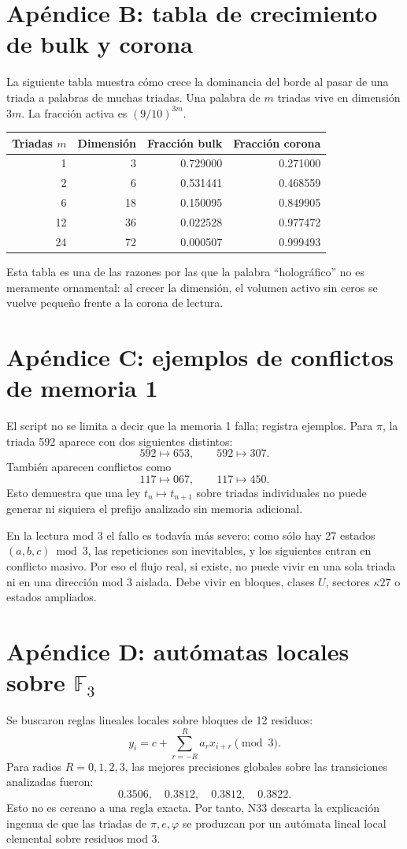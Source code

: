 \documentclass[11pt,a4paper]{article}
\begin{document}
\section{Apéndice B: tabla de crecimiento de bulk y corona}
La siguiente tabla muestra cómo crece la dominancia del borde al pasar de una triada a palabras de muchas triadas. Una palabra de \(m\) triadas vive en dimensión \(3m\). La fracción activa es \((9/10)^{3m}\).

\begin{center}
\begin{tabular}{rrrr}
\toprule
Triadas \(m\) & Dimensión & Fracción bulk & Fracción corona\\
\midrule
1 & 3 & 0.729000 & 0.271000\\
2 & 6 & 0.531441 & 0.468559\\
6 & 18 & 0.150095 & 0.849905\\
12 & 36 & 0.022528 & 0.977472\\
24 & 72 & 0.000507 & 0.999493\\
\bottomrule
\end{tabular}
\end{center}

Esta tabla es una de las razones por las que la palabra ``holográfico'' no es meramente ornamental: al crecer la dimensión, el volumen activo sin ceros se vuelve pequeño frente a la corona de lectura.

\section{Apéndice C: ejemplos de conflictos de memoria 1}
El script no se limita a decir que la memoria 1 falla; registra ejemplos. Para \(\pi\), la triada 592 aparece con dos siguientes distintos:
\[
592\mapsto653,
\qquad
592\mapsto307.
\]
También aparecen conflictos como
\[
117\mapsto067,
\qquad
117\mapsto450.
\]
Esto demuestra que una ley \(t_n\mapsto t_{n+1}\) sobre triadas individuales no puede generar ni siquiera el prefijo analizado sin memoria adicional.

En la lectura mod 3 el fallo es todavía más severo: como sólo hay 27 estados \((a,b,c)\bmod3\), las repeticiones son inevitables, y los siguientes entran en conflicto masivo. Por eso el flujo real, si existe, no puede vivir en una sola triada ni en una dirección mod 3 aislada. Debe vivir en bloques, clases \(U\), sectores \(\kappa27\) o estados ampliados.

\section{Apéndice D: autómatas locales sobre \(\mathbb F_3\)}
Se buscaron reglas lineales locales sobre bloques de 12 residuos:
\[
y_i=c+\sum_{r=-R}^{R}a_r x_{i+r}\pmod3.
\]
Para radios \(R=0,1,2,3\), las mejores precisiones globales sobre las transiciones analizadas fueron:
\[
0.3506,
\quad
0.3812,
\quad
0.3812,
\quad
0.3822.
\]
Esto no es cercano a una regla exacta. Por tanto, N33 descarta la explicación ingenua de que las triadas de \(\pi,e,\varphi\) se produzcan por un autómata lineal local elemental sobre residuos mod 3.
\end{document}
